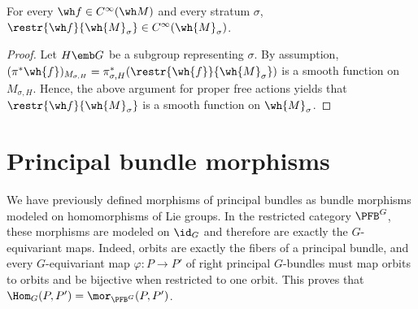 \begin{prop}
    For every $\wh f\in C^\infty(\wh M)$ and every stratum $\sigma$, $\restr{\wh f}{\wh{M}_\sigma}\in C^\infty(\wh{M}_\sigma)$.
\end{prop}
\begin{proof}
    Let $H\emb G$ be a subgroup representing $\sigma$. By assumption, $(\pi^\ast\wh{f})_{M_{\sigma,H}}=\pi^\ast_{\sigma,H}(\restr{\wh{f}}{\wh{M}_\sigma})$ is a smooth function on $M_{\sigma,H}$. Hence, the above argument for proper free actions yields that $\restr{\wh f}{\wh{M}_\sigma}$ is a smooth function on $\wh{M}_\sigma$.
\end{proof}







\section{Principal bundle morphisms}


We have previously defined morphisms of principal bundles as bundle morphisms modeled on homomorphisms of Lie groups. In the restricted category $\PFB^G$, these morphisms are modeled on $\id_G$ and therefore are exactly the $G$-equivariant maps. Indeed, orbits are exactly the fibers of a principal bundle, and every $G$-equivariant map $\varphi:P\to P'$ of right principal $G$-bundles must map orbits to orbits and be bijective when restricted to one orbit. This proves that $\Hom_G(P,P')=\mor_{\PFB^G}(P,P')$.

